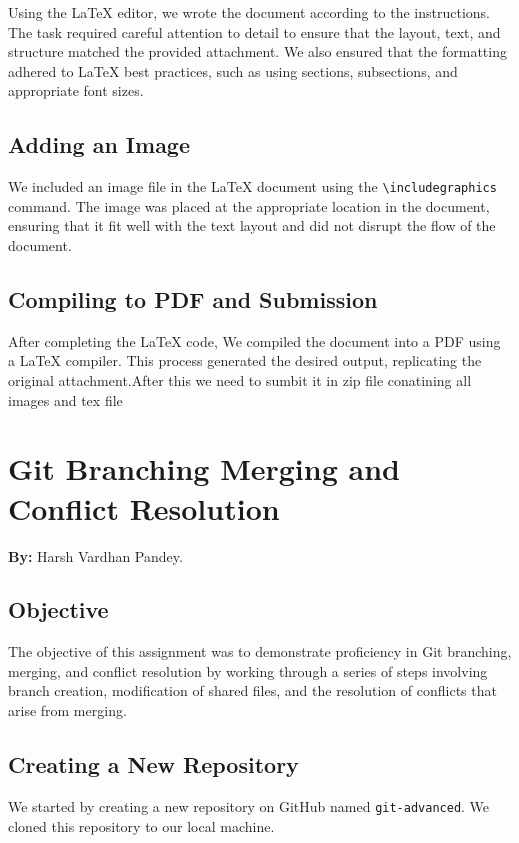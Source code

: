 \documentclass[a4paper,12pt]{article}
\begin{document}
Using the LaTeX editor, we wrote the document according to the instructions. The task required careful attention to detail to ensure that the layout, text, and structure matched the provided attachment. We also ensured that the formatting adhered to LaTeX best practices, such as using sections, subsections, and appropriate font sizes.

\subsection{Adding an Image}

We included an image file in the LaTeX document using the \texttt{\textbackslash includegraphics} command. The image was placed at the appropriate location in the document, ensuring that it fit well with the text layout and did not disrupt the flow of the document.

\subsection{Compiling to PDF and Submission}

After completing the LaTeX code, We compiled the document into a PDF using a LaTeX compiler. This process generated the desired output, replicating the original attachment.After this we need to sumbit it in zip file conatining all images and tex file


\newpage

\section{Git Branching Merging and Conflict Resolution}
\textbf{By:} Harsh Vardhan Pandey.

\subsection{Objective}
The objective of this assignment was to demonstrate proficiency in Git branching, merging, and conflict resolution by working through a series of steps involving branch creation, modification of shared files, and the resolution of conflicts that arise from merging.


\subsection{ Creating a New Repository}
We started by creating a new repository on GitHub named \texttt{git-advanced}. We cloned this repository to our local machine.
\end{document}
